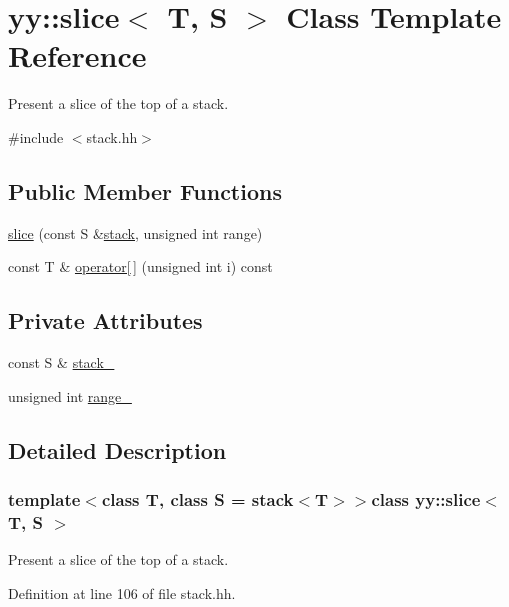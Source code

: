 \hypertarget{classyy_1_1slice}{
\section{yy::slice$<$ T, S $>$ Class Template Reference}
\label{classyy_1_1slice}
}


Present a slice of the top of a stack.  




{\ttfamily \#include $<$stack.hh$>$}

\subsection*{Public Member Functions}
\begin{DoxyCompactItemize}
\item 
\hyperlink{classyy_1_1slice_a09b1750a81ae90227fdceb482fa06797}{slice} (const S \&\hyperlink{classyy_1_1stack}{stack}, unsigned int range)
\item 
const T \& \hyperlink{classyy_1_1slice_ad44e52c28c2962f9dd5bf327510c1237}{operator\mbox{[}$\,$\mbox{]}} (unsigned int i) const 
\end{DoxyCompactItemize}
\subsection*{Private Attributes}
\begin{DoxyCompactItemize}
\item 
const S \& \hyperlink{classyy_1_1slice_a0fe0ae83463e410ba2e2f6fc1e1d1fc4}{stack\_\-}
\item 
unsigned int \hyperlink{classyy_1_1slice_ab9c0f9775d55a20ebab97e056a7cd152}{range\_\-}
\end{DoxyCompactItemize}


\subsection{Detailed Description}
\subsubsection*{template$<$class T, class S = stack$<$T$>$$>$class yy::slice$<$ T, S $>$}

Present a slice of the top of a stack. 

Definition at line 106 of file stack.hh.



